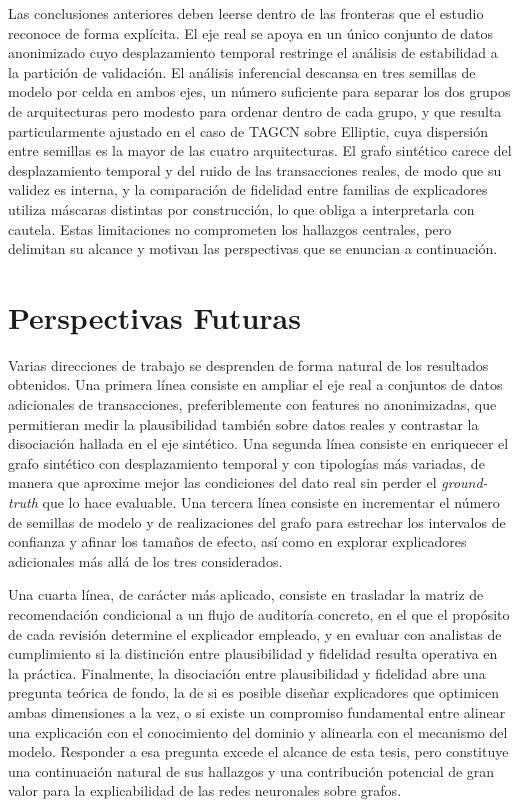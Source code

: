 Las conclusiones anteriores deben leerse dentro de las fronteras que el estudio reconoce de forma explícita. El eje real se apoya en un único conjunto de datos anonimizado cuyo desplazamiento temporal restringe el análisis de estabilidad a la partición de validación. El análisis inferencial descansa en tres semillas de modelo por celda en ambos ejes, un número suficiente para separar los dos grupos de arquitecturas pero modesto para ordenar dentro de cada grupo, y que resulta particularmente ajustado en el caso de TAGCN sobre Elliptic, cuya dispersión entre semillas es la mayor de las cuatro arquitecturas. El grafo sintético carece del desplazamiento temporal y del ruido de las transacciones reales, de modo que su validez es interna, y la comparación de fidelidad entre familias de explicadores utiliza máscaras distintas por construcción, lo que obliga a interpretarla con cautela. Estas limitaciones no comprometen los hallazgos centrales, pero delimitan su alcance y motivan las perspectivas que se enuncian a continuación.

\section{Perspectivas Futuras}

Varias direcciones de trabajo se desprenden de forma natural de los resultados obtenidos. Una primera línea consiste en ampliar el eje real a conjuntos de datos adicionales de transacciones, preferiblemente con features no anonimizadas, que permitieran medir la plausibilidad también sobre datos reales y contrastar la disociación hallada en el eje sintético. Una segunda línea consiste en enriquecer el grafo sintético con desplazamiento temporal y con tipologías más variadas, de manera que aproxime mejor las condiciones del dato real sin perder el \textit{ground-truth} que lo hace evaluable. Una tercera línea consiste en incrementar el número de semillas de modelo y de realizaciones del grafo para estrechar los intervalos de confianza y afinar los tamaños de efecto, así como en explorar explicadores adicionales más allá de los tres considerados.

Una cuarta línea, de carácter más aplicado, consiste en trasladar la matriz de recomendación condicional a un flujo de auditoría concreto, en el que el propósito de cada revisión determine el explicador empleado, y en evaluar con analistas de cumplimiento si la distinción entre plausibilidad y fidelidad resulta operativa en la práctica. Finalmente, la disociación entre plausibilidad y fidelidad abre una pregunta teórica de fondo, la de si es posible diseñar explicadores que optimicen ambas dimensiones a la vez, o si existe un compromiso fundamental entre alinear una explicación con el conocimiento del dominio y alinearla con el mecanismo del modelo. Responder a esa pregunta excede el alcance de esta tesis, pero constituye una continuación natural de sus hallazgos y una contribución potencial de gran valor para la explicabilidad de las redes neuronales sobre grafos.

